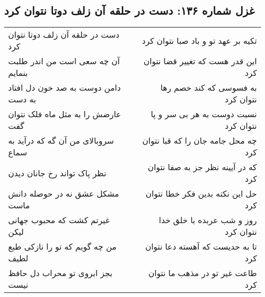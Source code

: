 \begin{center}
\section*{غزل شماره ۱۳۶: دست در حلقه آن زلف دوتا نتوان کرد}
\label{sec:sh136}
\begin{longtable}{l p{0.5cm} r}
دست در حلقه آن زلف دوتا نتوان کرد
&&
تکیه بر عهد تو و باد صبا نتوان کرد
\\
آن چه سعی است من اندر طلبت بنمایم
&&
این قدر هست که تغییر قضا نتوان کرد
\\
دامن دوست به صد خون دل افتاد به دست
&&
به فسوسی که کند خصم رها نتوان کرد
\\
عارضش را به مثل ماه فلک نتوان گفت
&&
نسبت دوست به هر بی سر و پا نتوان کرد
\\
سروبالای من آن گه که درآید به سماع
&&
چه محل جامه جان را که قبا نتوان کرد
\\
نظر پاک تواند رخ جانان دیدن
&&
که در آیینه نظر جز به صفا نتوان کرد
\\
مشکل عشق نه در حوصله دانش ماست
&&
حل این نکته بدین فکر خطا نتوان کرد
\\
غیرتم کشت که محبوب جهانی لیکن
&&
روز و شب عربده با خلق خدا نتوان کرد
\\
من چه گویم که تو را نازکی طبع لطیف
&&
تا به حدیست که آهسته دعا نتوان کرد
\\
بجز ابروی تو محراب دل حافظ نیست
&&
طاعت غیر تو در مذهب ما نتوان کرد
\\
\end{longtable}
\end{center}
